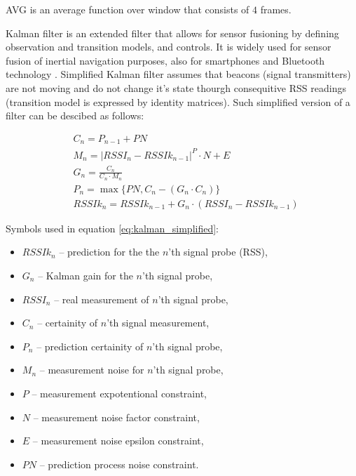 \documentclass[../main.tex]{subfiles}
\begin{document}
AVG is an average function over window that consists of $4$ frames.

Kalman filter is an extended filter that allows for sensor fusioning by defining observation and transition models, and controls. It is widely used for sensor fusion of inertial navigation purposes\cite{inertial_navi_velocity_model}, also for smartphones \cite{inertial_navi_bike}\cite{indoor_navi_for_android}\cite{thesis_smartphone_inertial_plus_rfid} and Bluetooth technology \cite{beacon_rssi_analysis}\cite{discover_beacons_and_position}\cite{article_indoor_ble_rssi_filtering}\cite{article_inertial_active_beacons_calculus_kalman}. Simplified Kalman filter assumes that beacons (signal transmitters) are not moving and do not change it's state thourgh consequitive RSS readings (transition model is expressed by identity matrices). Such simplified version of a filter can be descibed as follows:

\begin{equation}
\label{eq:kalman_simplified}
\begin{aligned}
& C_n = P_{n-1} + PN	\\
& M_n = |RSSI_n-RSSIk_{n-1}|^P \cdot N + E	\\
& G_n = \frac{C_n}{C_n \cdot M_n}	\\
& P_n = \max\{PN, C_n - (G_n \cdot C_n)\}	\\
& RSSIk_n = RSSIk_{n-1} + G_n \cdot (RSSI_n -  RSSIk_{n-1})
\end{aligned}
\end{equation}

Symbols used in equation \ref{eq:kalman_simplified}:
\begin{itemize}
	\item $RSSIk_n$ -- prediction for the the $n$'th signal probe (RSS),
	\item $G_n$ -- Kalman gain for the $n$'th signal probe,
	\item $RSSI_n$ -- real measurement of $n$'th signal probe,
	\item $C_n$ -- certainity of $n$'th signal measurement,
	\item $P_n$ -- prediction certainity of $n$'th signal probe,
	\item $M_n$ -- measurement noise for $n$'th signal probe,
	\item $P$ -- measurement expotentional constraint,
	\item $N$ -- measurement noise factor constraint,
	\item $E$ -- measurement noise epsilon constraint,
	\item $PN$ -- prediction process noise constraint.
\end{itemize}
\end{document}
